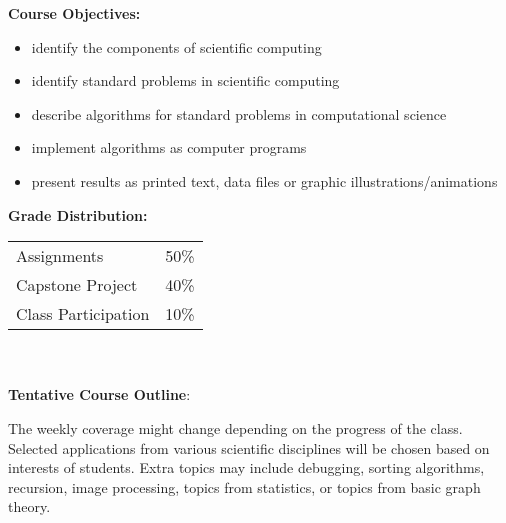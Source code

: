 \documentclass[11pt]{article}
\begin{document}
\textbf {\large Course Objectives:} 
\begin{itemize} \itemsep-0.4em
\item identify the components of scientific computing
\item identify standard problems in scientific computing
\item describe algorithms for standard problems in computational science
\item implement algorithms as computer programs
\item present results as printed text, data files or graphic illustrations/animations
\end{itemize}


\textbf {\large Grade Distribution:} \\
\hspace*{40mm}
\begin{tabular}{ l l }
Assignments & 50\% \\
Capstone Project & 40\% \\
Class Participation &10\%
\end{tabular} \\\\


\textbf {\large Tentative Course Outline}:

The weekly coverage might change depending on the progress of the class.  Selected applications from various scientific disciplines will be chosen based on interests of students. Extra topics may include debugging, sorting algorithms, recursion, image processing, topics from statistics, or topics from basic graph theory.
\end{document}

